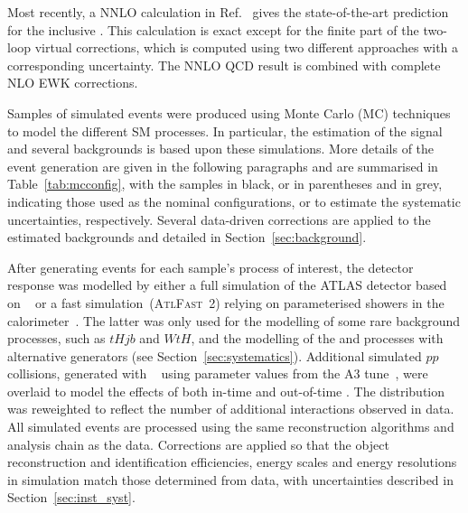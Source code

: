 \documentclass[cernpreprint, atlasdraft=false, texlive=2023, UKenglish, texmf, orcidlogo]{atlasdoc}
\begin{document}
Most recently, a NNLO calculation in Ref.~\cite{Buonocore_2023}
gives the state-of-the-art prediction for the
inclusive \ttW \xs. This calculation is exact except for the finite
part of the two-loop virtual corrections, which is computed using two
different approaches with a corresponding uncertainty. The NNLO QCD
result is combined with complete NLO EWK corrections.
 
 
 
Samples of simulated events were produced using Monte Carlo (MC)
techniques to model the different SM processes. In particular, the
estimation of the \ttW signal and several backgrounds is
based upon these simulations. More details of the event generation are
given in the following paragraphs and are summarised in Table~\ref{tab:mcconfig},
with the samples in black, or in parentheses and in grey, indicating those used as the
nominal configurations, or to estimate the systematic uncertainties, respectively.
Several data-driven corrections are applied to
the estimated backgrounds and detailed in Section~\ref{sec:background}.
 
After generating events for each sample's process of interest, the
detector response was modelled by either a full simulation of the
ATLAS detector based on \GEANT~\cite{SOFT-2010-01,Agostinelli:2002hh}
or a fast simulation~(\textsc{AtlFast~2}) relying on parameterised
showers in the
calorimeter~\cite{ATL-PHYS-PUB-2010-013,ATL-SOFT-PUB-2018-002}.
The latter was only used for the modelling of some rare background processes, such as $tHjb$ and $WtH$,
and the modelling of the \ttZ and \ttH processes with alternative generators (see Section~\ref{sec:systematics}).
Additional simulated $pp$ collisions, generated with \Pythia[8.186]~\cite{Sjostrand:2007gs} using
parameter values from the A3 tune~\cite{ATL-PHYS-PUB-2011-014},
were overlaid to model the effects of both in-time and
out-of-time \pileup. The \pileup distribution was reweighted to
reflect the number of additional interactions observed in
data. All simulated events are processed using the same
reconstruction algorithms and analysis chain as the data. Corrections are applied so that the object reconstruction and
identification efficiencies, energy scales and energy resolutions
in simulation match those determined from data, with uncertainties described in Section~\ref{sec:inst_syst}.
 
\end{document}
